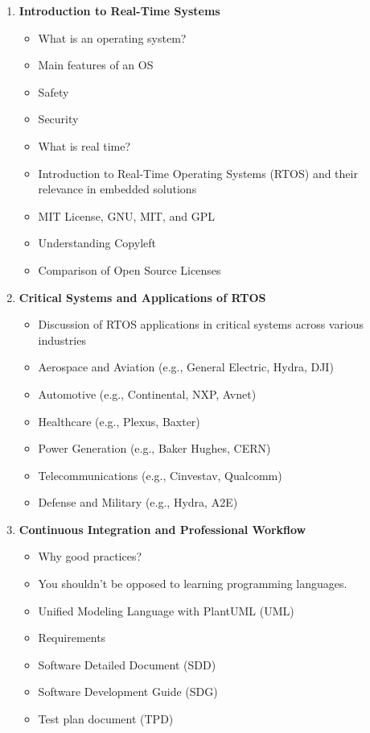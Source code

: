 \begin{enumerate}[label=\textbf{Week \arabic*:}]
\item \textbf{ Introduction to Real-Time Systems }
\begin{itemize}
  \item What is an operating system?
  \item Main features of an OS
  \item Safety
  \item Security
  \item What is real time?
  \item Introduction to Real-Time Operating Systems (RTOS) and their relevance in embedded solutions
  \item MIT License, GNU, MIT, and GPL
  \item Understanding Copyleft
  \item Comparison of Open Source Licenses
\end{itemize}
\item \textbf{ Critical Systems and Applications of RTOS }
\begin{itemize}
  \item Discussion of RTOS applications in critical systems across various industries
  \item Aerospace and Aviation (e.g., General Electric, Hydra, DJI)
  \item Automotive (e.g., Continental, NXP, Avnet)
  \item Healthcare (e.g., Plexus, Baxter)
  \item Power Generation (e.g., Baker Hughes, CERN)
  \item Telecommunications (e.g., Cinvestav, Qualcomm)
  \item Defense and Military (e.g., Hydra, A2E)
\end{itemize}
\item \textbf{ Continuous Integration and Professional Workflow }
\begin{itemize}
  \item Why good practices?
  \item You shouldn't be opposed to learning programming languages.
  \item Unified Modeling Language with PlantUML (UML)
  \item Requirements
  \item Software Detailed Document (SDD)
  \item Software Development Guide (SDG)
  \item Test plan document (TPD)

\end{itemize}
\end{enumerate}
